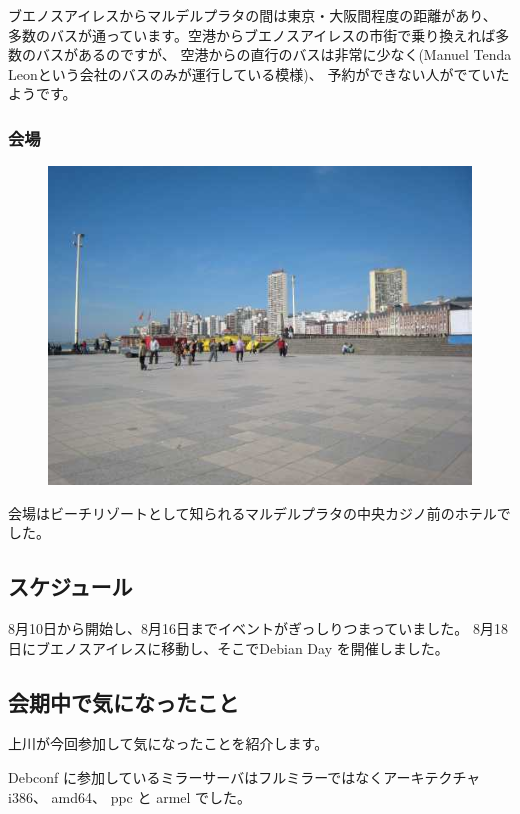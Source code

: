 \documentclass[mingoth,a4paper]{jsarticle}
\begin{document}
ブエノスアイレスからマルデルプラタの間は東京・大阪間程度の距離があり、
多数のバスが通っています。空港からブエノスアイレスの市街で乗り換えれば多数のバスがあるのですが、
空港からの直行のバスは非常に少なく(Manuel Tenda Leonという会社のバスのみが運行している模様)、
予約ができない人がでていたようです。

\subsubsection{会場}

\begin{figure}
  \includegraphics[width=\hsize]{image200810/mdq-area.jpg}
\end{figure}
会場はビーチリゾートとして知られるマルデルプラタの中央カジノ前のホテルでした。
\\


\subsection{スケジュール}

8月10日から開始し、8月16日までイベントがぎっしりつまっていました。
8月18日にブエノスアイレスに移動し、そこでDebian Day を開催しました。

\subsection{会期中で気になったこと}

上川が今回参加して気になったことを紹介します。

Debconf に参加しているミラーサーバはフルミラーではなくアーキテクチャ
i386、 amd64、 ppc と armel でした。
\end{document}
